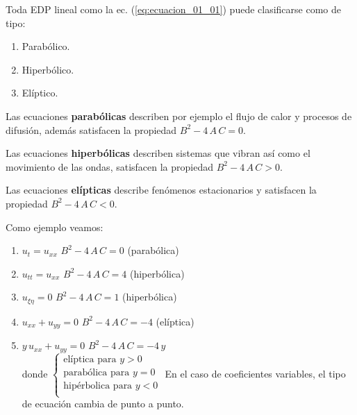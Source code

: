 Toda EDP lineal como la ec. (\ref{eq:ecuacion_01_01}) puede clasificarse como de tipo:
\begin{enumerate}
\item Parabólico.
\item Hiperbólico.
\item Elíptico.
\end{enumerate}

Las ecuaciones \textbf{parabólicas} describen por ejemplo el flujo de calor y procesos de difusión, además satisfacen la propiedad $B^{2} - 4 \, A \, C = 0$.
\par
Las ecuaciones \textbf{hiperbólicas} describen sistemas que vibran así como el movimiento de las ondas, satisfacen la propiedad $B^{2} - 4 \, A \, C > 0$.
\par
Las ecuaciones \textbf{elípticas} describe fenómenos estacionarios y satisfacen la propiedad $B^{2} - 4 \, A \, C < 0$.

Como ejemplo veamos:
\begin{enumerate}
\setlength\itemsep{1em}
\item $u_{t} = u_{xx}$ \hspace{1cm} $B^{2} - 4 \, A \, C = 0$ \hspace{1cm} (parabólica)
\item $u_{tt} = u_{xx}$ \hspace{0.8cm} $B^{2} - 4 \, A \, C = 4$ \hspace{1cm} (hiperbólica)
\item $u_{\xi \eta} = 0$ \hspace{1cm} $B^{2} - 4 \, A \, C = 1$ \hspace{1cm} (hiperbólica)
\item $u_{xx} + u_{yy} = 0$ \hspace{1cm} $B^{2} - 4 \, A \, C = -4$ \hspace{0.6cm} (elíptica)
\item $y \, u_{xx} + u_{yy} = 0$ \hspace{0.6cm} $B^{2} - 4 \, A \, C = - 4 \, y$ 
\\
donde $\begin{cases}
\mbox{elíptica para } y > 0 \\
\mbox{parabólica para } y = 0 \\
\mbox{hipérbolica para } y < 0 \\
\end{cases}$
\newline
En el caso de coeficientes variables, el tipo de ecuación cambia de punto a punto.
\end{enumerate}

